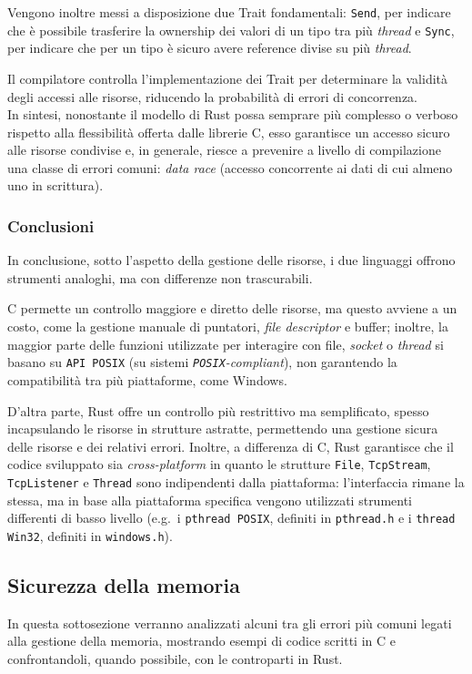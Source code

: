Vengono inoltre messi a disposizione due Trait fondamentali: \texttt{Send}, per indicare che è possibile trasferire la ownership dei valori di un tipo tra più \textit{thread} e \texttt{Sync}, per indicare che per un tipo è sicuro avere reference divise su più \textit{thread}.

Il compilatore controlla l'implementazione dei Trait per determinare la validità degli accessi alle risorse, riducendo la probabilità di errori di concorrenza. \hfill
\vspace{10pt}\\
\noindent In sintesi, nonostante il modello di Rust possa semprare più complesso o verboso rispetto alla flessibilità offerta dalle librerie C, esso
garantisce un accesso sicuro alle risorse condivise e, in generale, riesce a prevenire a livello di compilazione una classe di errori comuni: \textit{data race} (accesso concorrente ai dati di cui almeno uno in scrittura).

\subsubsection{Conclusioni}
In conclusione, sotto l'aspetto della gestione delle risorse, i due linguaggi offrono strumenti analoghi, ma con differenze non trascurabili.

C permette un controllo maggiore e diretto delle risorse, ma questo avviene a un costo, come la gestione manuale di puntatori, \textit{file descriptor}
 e buffer; inoltre, la maggior parte delle funzioni utilizzate per interagire con file, \textit{socket} o \textit{thread} si basano su \texttt{API POSIX} (su sistemi \textit{\texttt{POSIX}-compliant}), non garantendo la compatibilità 
tra più piattaforme, come Windows.

D'altra parte, Rust offre un controllo più restrittivo ma semplificato, spesso incapsulando le risorse in strutture astratte, permettendo una gestione sicura delle
 risorse e dei relativi
errori. Inoltre, a differenza di C, Rust garantisce che il codice sviluppato sia \textit{cross-platform} in quanto le strutture \texttt{File}, \texttt{TcpStream}, \texttt{TcpListener} e \texttt{Thread} 
sono indipendenti dalla piattaforma: l'interfaccia rimane la stessa, ma in base alla piattaforma specifica vengono utilizzati strumenti differenti di 
basso livello (e.g.\  i \texttt{pthread POSIX}, definiti in \texttt{pthread.h} e i \texttt{thread Win32}, definiti in \texttt{windows.h}).

\subsection{Sicurezza della memoria}\label{sub:mem-safe}
In questa sottosezione verranno analizzati alcuni tra gli errori più comuni legati alla gestione della memoria,
mostrando esempi di codice scritti in C e confrontandoli, quando possibile, con le controparti in Rust.

